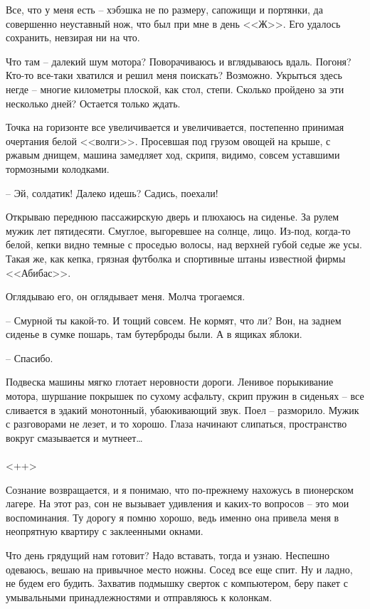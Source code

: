 \documentclass[a4paper]{book}
\begin{document}
Все, что у меня есть -- хэбэшка не по размеру, сапожищи и портянки, да совершенно неуставный нож, что был при мне в день <<Ж>>. Его удалось сохранить, невзирая ни на что.

Что там -- далекий шум мотора? Поворачиваюсь и вглядываюсь вдаль. Погоня? Кто-то все-таки хватился и решил меня поискать? Возможно. Укрыться здесь негде -- многие километры плоской, как стол, степи. Сколько пройдено за эти несколько дней? Остается только ждать.

Точка на горизонте все увеличивается и увеличивается, постепенно принимая очертания белой <<волги>>. Просевшая под грузом овощей на крыше, с ржавым днищем, машина замедляет ход, скрипя, видимо, совсем уставшими тормозными колодками.

-- Эй, солдатик! Далеко идешь? Садись, поехали!

Открываю переднюю пассажирскую дверь и плюхаюсь на сиденье. За рулем мужик лет пятидесяти. Смуглое, выгоревшее на солнце, лицо. Из-под, когда-то белой, кепки видно темные с проседью волосы, над верхней губой седые же усы. Такая же, как кепка, грязная футболка и спортивные штаны известной фирмы <<Абибас>>.

Оглядываю его, он оглядывает меня. Молча трогаемся.

-- Смурной ты какой-то. И тощий совсем. Не кормят, что ли? Вон, на заднем сиденье в сумке пошарь, там бутерброды были. А в ящиках яблоки.

-- Спасибо.

Подвеска машины мягко глотает неровности дороги. Ленивое порыкивание мотора, шуршание покрышек по сухому асфальту, скрип пружин в сиденьях -- все сливается в эдакий монотонный, убаюкивающий звук. Поел --  разморило. Мужик с разговорами не лезет, и то хорошо. Глаза начинают слипаться, пространство вокруг смазывается и мутнеет\ldots
\\
\paragraph{}<++>

Сознание возвращается, и я понимаю, что по-прежнему нахожусь в пионерском лагере. На этот раз, сон не вызывает удивления и каких-то вопросов -- это мои воспоминания. Ту дорогу я помню хорошо, ведь именно она привела меня в неопрятную квартиру с заклеенными окнами.

Что день грядущий нам готовит? Надо вставать, тогда и узнаю. Неспешно одеваюсь, вешаю на привычное место ножны. Сосед все еще спит. Ну и ладно, не будем его будить. Захватив подмышку сверток с компьютером, беру пакет с умывальными принадлежностями и отправляюсь к колонкам. 
\end{document}
